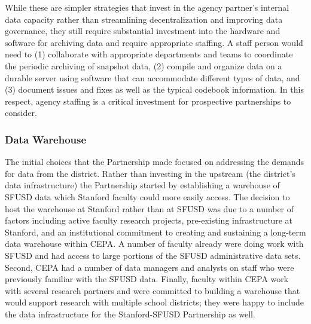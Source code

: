 While these are simpler strategies that invest in the agency partner's internal data capacity rather than streamlining decentralization and improving data governance, they still require substantial investment into the hardware and software for archiving data and require appropriate staffing. A staff person would need to (1) collaborate with appropriate departments and teams to coordinate the periodic archiving of snapshot data, (2) compile and organize data on a durable server using software that can accommodate different types of data, and (3) document issues and fixes as well as the typical codebook information. In this respect, agency staffing is a critical investment for prospective partnerships to consider.

\hypertarget{data-warehouse}{%
\subsubsection{Data Warehouse}\label{data-warehouse}}

The initial choices that the Partnership made focused on addressing the demands for data from the district. Rather than investing in the upstream (the district's data infrastructure) the Partnership started by establishing a warehouse of SFUSD data which Stanford faculty could more easily access. The decision to host the warehouse at Stanford rather than at SFUSD was due to a number of factors including active faculty research projects, pre-existing infrastructure at Stanford, and an institutional commitment to creating and sustaining a long-term data warehouse within CEPA. A number of faculty already were doing work with SFUSD and had access to large portions of the SFUSD administrative data sets. Second, CEPA had a number of data managers and analysts on staff who were previously familiar with the SFUSD data. Finally, faculty within CEPA work with several research partners and were committed to building a warehouse that would support research with multiple school districts; they were happy to include the data infrastructure for the Stanford-SFUSD Partnership as well.

